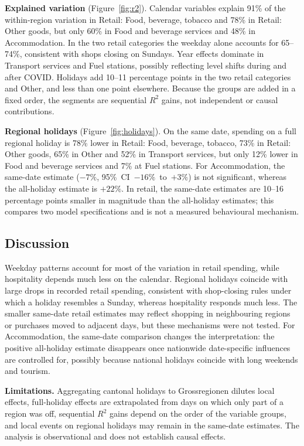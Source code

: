 \documentclass[10pt]{article}
\begin{document}
\textbf{Explained variation} (Figure~\ref{fig:r2}). Calendar variables explain 91\% of the within-region variation in Retail: Food, beverage, tobacco and 78\% in Retail: Other goods, but only 60\% in Food and beverage services and 48\% in Accommodation. In the two retail categories the weekday alone accounts for 65--74\%, consistent with shops closing on Sundays. Year effects dominate in Transport services and Fuel stations, possibly reflecting level shifts during and after COVID. Holidays add 10--11 percentage points in the two retail categories and Other, and less than one point elsewhere. Because the groups are added in a fixed order, the segments are sequential $R^2$ gains, not independent or causal contributions.

\textbf{Regional holidays} (Figure~\ref{fig:holidays}). On the same date, spending on a full regional holiday is 78\% lower in Retail: Food, beverage, tobacco, 73\% in Retail: Other goods, 65\% in Other and 52\% in Transport services, but only 12\% lower in Food and beverage services and 7\% at Fuel stations. For Accommodation, the same-date estimate ($-7\%$, 95\%~CI~$-16\%$~to~$+3\%$) is not significant, whereas the all-holiday estimate is $+22\%$. In retail, the same-date estimates are 10--16 percentage points smaller in magnitude than the all-holiday estimates; this compares two model specifications and is not a measured behavioural mechanism.

\subsection{Discussion}
Weekday patterns account for most of the variation in retail spending, while hospitality depends much less on the calendar. Regional holidays coincide with large drops in recorded retail spending, consistent with shop-closing rules under which a holiday resembles a Sunday, whereas hospitality responds much less. The smaller same-date retail estimates may reflect shopping in neighbouring regions or purchases moved to adjacent days, but these mechanisms were not tested. For Accommodation, the same-date comparison changes the interpretation: the positive all-holiday estimate disappears once nationwide date-specific influences are controlled for, possibly because national holidays coincide with long weekends and tourism.

\textbf{Limitations.} Aggregating cantonal holidays to Grossregionen dilutes local effects, full-holiday effects are extrapolated from days on which only part of a region was off, sequential $R^2$ gains depend on the order of the variable groups, and local events on regional holidays may remain in the same-date estimates. The analysis is observational and does not establish causal effects.
\end{document}
